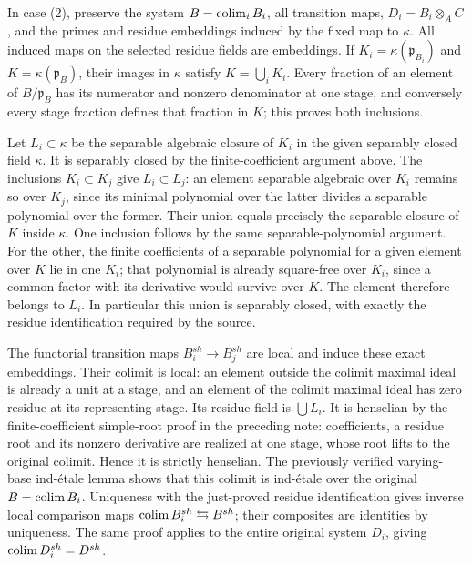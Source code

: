 In case (2), preserve the system \(B=\mathop{\rm colim}_i B_i\), all transition maps, \(D_i=B_i\otimes_A C\), and the primes and residue embeddings induced by the fixed map to \(\kappa\). All induced maps on the selected residue fields are embeddings. If \(K_i=\kappa(\mathfrak p_{B_i})\) and \(K=\kappa(\mathfrak p_B)\), their images in \(\kappa\) satisfy \(K=\bigcup_i K_i\). Every fraction of an element of \(B/\mathfrak p_B\) has its numerator and nonzero denominator at one stage, and conversely every stage fraction defines that fraction in \(K\); this proves both inclusions.

Let \(L_i\subset\kappa\) be the separable algebraic closure of \(K_i\) in the given separably closed field \(\kappa\). It is separably closed by the finite-coefficient argument above. The inclusions \(K_i\subset K_j\) give \(L_i\subset L_j\): an element separable algebraic over \(K_i\) remains so over \(K_j\), since its minimal polynomial over the latter divides a separable polynomial over the former. Their union equals precisely the separable closure of \(K\) inside \(\kappa\). One inclusion follows by the same separable-polynomial argument. For the other, the finite coefficients of a separable polynomial for a given element over \(K\) lie in one \(K_i\); that polynomial is already square-free over \(K_i\), since a common factor with its derivative would survive over \(K\). The element therefore belongs to \(L_i\). In particular this union is separably closed, with exactly the residue identification required by the source.

The functorial transition maps \(B_i^{sh}\to B_j^{sh}\) are local and induce these exact embeddings. Their colimit is local: an element outside the colimit maximal ideal is already a unit at a stage, and an element of the colimit maximal ideal has zero residue at its representing stage. Its residue field is \(\bigcup L_i\). It is henselian by the finite-coefficient simple-root proof in the preceding note: coefficients, a residue root and its nonzero derivative are realized at one stage, whose root lifts to the original colimit. Hence it is strictly henselian. The previously verified varying-base ind-étale lemma shows that this colimit is ind-étale over the original \(B=\mathop{\rm colim}B_i\). Uniqueness with the just-proved residue identification gives inverse local comparison maps \(\mathop{\rm colim}B_i^{sh}\leftrightarrows B^{sh}\); their composites are identities by uniqueness. The same proof applies to the entire original system \(D_i\), giving \(\mathop{\rm colim}D_i^{sh}=D^{sh}\).

